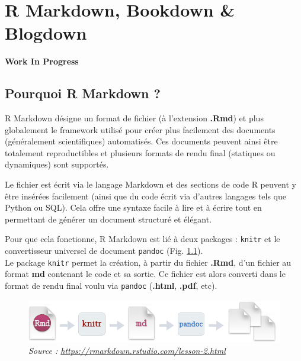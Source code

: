 \documentclass[
  french,
]{book}
\newenvironment{infobox}[1]
  {
  \begin{itemize}
  \renewcommand{\labelitemi}{
    \raisebox{-.7\height}[0pt][0pt]{
      {\setkeys{Gin}{width=3em,keepaspectratio}
        \texttt{[image: images/\#1]}}
    }
  }
  \setlength{\fboxsep}{1em}
  \begin{blackbox}
  \item
  }
  {
  \end{blackbox}
  \end{itemize}
  }
\begin{document}
\hypertarget{rmarkdown}{%
\chapter{R Markdown, Bookdown \& Blogdown}\label{rmarkdown}}

\begin{infobox}{caution}

\textbf{Work In Progress}

\end{infobox}

\hypertarget{pourquoi-rmarkdown}{%
\section{Pourquoi R Markdown ?}\label{pourquoi-rmarkdown}}

R Markdown désigne un format de fichier (à l'extension \textbf{.Rmd}) et plus
globalement le framework utilisé pour créer plus facilement des documents
(généralement scientifiques) automatisés. Ces documents peuvent ainsi être
totalement reproductibles et plusieurs formats de rendu final (statiques ou
dynamiques) sont supportés.

Le fichier est écrit via le langage Markdown et des sections de code R peuvent y
être insérées facilement (ainsi que du code écrit via d'autres langages tels
que Python ou SQL). Cela offre une syntaxe facile à lire et à écrire tout en
permettant de générer un document structuré et élégant.

Pour que cela fonctionne, R Markdown est lié à deux packages : \texttt{knitr} et le
convertisseur universel de document \texttt{pandoc} (Fig. \ref{fig:rmarkdownflow}).\\
Le package \texttt{knitr} permet la création, à partir du fichier \textbf{.Rmd}, d'un fichier
au format \textbf{md} contenant le code et sa sortie. Ce fichier est alors converti
dans le format de rendu final voulu via \texttt{pandoc} (\textbf{.html}, \textbf{.pdf}, etc).



\begin{figure}

{\centering \includegraphics[width=0.6\linewidth]{images/rmarkdownflow} 

}

\caption{\emph{Source : \url{https://rmarkdown.rstudio.com/lesson-2.html}}}\label{fig:rmarkdownflow}
\end{figure}
\end{document}
